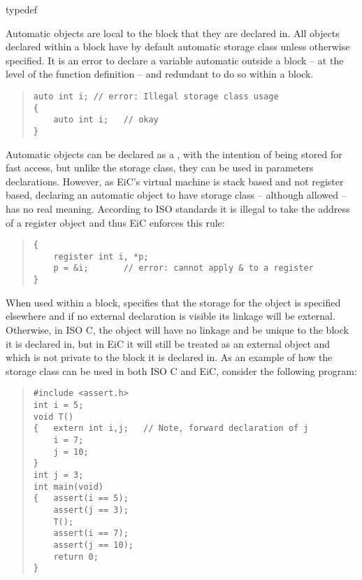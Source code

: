 \small
\begin{Ventry}{typedef}
\item[auto]
\label{item:auto}
        Automatic objects are local to the block that they are
 declared in. All objects declared within a block have by default
 automatic storage class unless otherwise specified.  It is an
 error to declare a variable automatic outside a block -- at the
 level of the function definition -- and redundant to do so within
 a block.
\begin{quote}
\begin{verbatim}
auto int i; // error: Illegal storage class usage
{
    auto int i;   // okay 
}
\end{verbatim}
\end{quote}

\item[register]
\label{item:register}
Automatic objects can be declared as a , with the
intention of being stored for fast access, but unlike the
 storage class, they can be  used in parameters declarations.
However, as EiC's virtual machine is stack based and not register
based, declaring an automatic object to have storage class
 -- although allowed -- has no real meaning. According 
to ISO standards it is illegal to take the address of a register
object and thus EiC enforces this rule:
\begin{quote}
\begin{verbatim}
{
    register int i, *p;
    p = &i;       // error: cannot apply & to a register 
}
\end{verbatim}
\end{quote}

\item[extern]
\label{item:extern}
When used within a block,  specifies that the storage for
the object is specified elsewhere and if no external declaration is
visible its linkage will be external. Otherwise, in ISO C, the object
will have no linkage and be unique to the block it is declared in, but
in EiC it will still be treated as an external object and which is not
private to the block it is declared in. As an example of how the storage
class  can be used in both ISO C and EiC, consider the
following program:
\begin{quote}
\begin{verbatim}
#include <assert.h>
int i = 5;
void T()
{   extern int i,j;   // Note, forward declaration of j
    i = 7;
    j = 10;
}
int j = 3;
int main(void)
{   assert(i == 5);
    assert(j == 3);
    T();
    assert(i == 7);
    assert(j == 10);
    return 0;
}
\end{verbatim}
\end{quote}


\end{Ventry}
